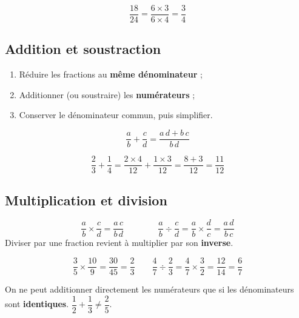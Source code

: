 \documentclass[a4paper,11pt]{article}
\begin{document}
\begin{exemple}
\[
\frac{18}{24} = \frac{6 \times 3}{6 \times 4} = \frac{3}{4}
\]
\end{exemple}

\subsection{Addition et soustraction}

\begin{methode}
\begin{enumerate}
  \item Réduire les fractions au \textbf{même dénominateur} ;
  \item Additionner (ou soustraire) les \textbf{numérateurs} ;
  \item Conserver le dénominateur commun, puis simplifier.
\end{enumerate}
\[
\frac{a}{b} + \frac{c}{d} = \frac{a\,d + b\,c}{b\,d}
\]
\end{methode}

\begin{exemple}
\[
\frac{2}{3} + \frac{1}{4} = \frac{2 \times 4}{12} + \frac{1 \times 3}{12} = \frac{8 + 3}{12} = \frac{11}{12}
\]
\end{exemple}

\subsection{Multiplication et division}

\begin{theoreme}
\[
\frac{a}{b} \times \frac{c}{d} = \frac{a\,c}{b\,d}
\qquad\qquad
\frac{a}{b} \div \frac{c}{d} = \frac{a}{b} \times \frac{d}{c} = \frac{a\,d}{b\,c}
\]
Diviser par une fraction revient à multiplier par son \textbf{inverse}.
\end{theoreme}

\begin{exemple}
\[
\frac{3}{5} \times \frac{10}{9} = \frac{30}{45} = \frac{2}{3}
\qquad
\frac{4}{7} \div \frac{2}{3} = \frac{4}{7} \times \frac{3}{2} = \frac{12}{14} = \frac{6}{7}
\]
\end{exemple}

\begin{piege}
On ne peut additionner directement les numérateurs que si les dénominateurs sont \textbf{identiques}. $\dfrac{1}{2} + \dfrac{1}{3} \neq \dfrac{2}{5}$.
\end{piege}
\end{document}
